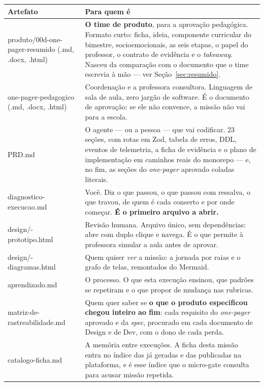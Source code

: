 \documentclass[11pt,a4paper]{article}
\newcommand{\cod}[1]{{\ttfamily\small #1}}
\begin{document}
\vspace{0.4em}
\begin{center}
\begin{tabularx}{\textwidth}{>{\ttfamily\scriptsize\color{unNavy}\raggedright\arraybackslash}p{4.3cm}>{\raggedright\arraybackslash\footnotesize}X}
\toprule
\rmfamily\sffamily\bfseries\footnotesize\color{unNavy}Artefato & \sffamily\bfseries\footnotesize\color{unNavy}Para quem é \\
\midrule
produto/\allowbreak 00d-one-pager-\allowbreak resumido \newline (\cod{.md}, \cod{.docx}, \cod{.html}) & \textbf{O time de produto}, para a aprovação pedagógica. Formato curto: ficha, ideia, componente curricular do bimestre, socioemocionais, as seis etapas, o papel do professor, o contrato de evidência e o \emph{takeaway}. Nasceu da comparação com o documento que o time escrevia à mão --- ver Seção~\ref{sec:resumido}. \\
\addlinespace
one-pager-\allowbreak pedagogico \newline (\cod{.md}, \cod{.docx}, \cod{.html}) & Coordenação e a professora consultora. Linguagem de sala de aula, zero jargão de software. É o documento de aprovação: se ele não convence, a missão não vai para a escola. \\
\addlinespace
PRD.md & O agente --- ou a pessoa --- que vai codificar. 23 seções, com rotas em Zod, tabela de erros, DDL, eventos de telemetria, a ficha de evidência e o plano de implementação em caminhos reais do monorepo --- e, no fim, as seções do \emph{one-pager} aprovado coladas literais. \\
\addlinespace
diagnostico-\allowbreak execucao.md & Você. Diz o que passou, o que passou com ressalva, o que travou, de quem é cada conserto e por onde começar. \textbf{É o primeiro arquivo a abrir.} \\
\addlinespace
design/\allowbreak 08-prototipo.html & Revisão humana. Arquivo único, sem dependências: abre com duplo clique e navega. É o que permite à professora simular a aula antes de aprovar. \\
\addlinespace
design/\allowbreak 09-diagramas.html & Quem quiser \emph{ver} a missão: a jornada por raias e o grafo de telas, remontados do Mermaid. \\
\addlinespace
aprendizado.md & O processo. O que esta execução ensinou, que padrões se repetiram e o que propor de mudança nas rubricas. \\
\addlinespace
matriz-de-\allowbreak rastreabilidade.md & Quem quer saber se \textbf{o que o produto especificou chegou inteiro ao fim}: cada requisito do \emph{one-pager} aprovado e da \emph{spec}, procurado em cada documento de Design e de Dev, com o dono de cada perda. \\
\addlinespace
catalogo-ficha.md & A memória entre execuções. A ficha desta missão entra no índice das já geradas e das publicadas na plataforma, e é esse índice que o micro-gate consulta para acusar missão repetida. \\
\bottomrule
\end{tabularx}
\end{center}
\end{document}

